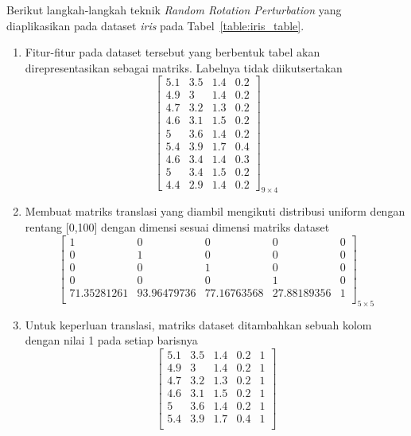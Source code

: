 \documentclass[a4paper,twoside]{article}
\begin{document}
\begin{enumerate}
		Berikut langkah-langkah teknik \textit{Random Rotation Perturbation} yang diaplikasikan pada dataset \textit{iris} pada Tabel~\ref{table:iris_table}.
		\begin{enumerate}
			\item Fitur-fitur pada dataset tersebut yang berbentuk tabel akan direpresentasikan sebagai matriks. Labelnya tidak diikutsertakan
			\[
				\begin{bmatrix}
				5.1		&		3.5		&		1.4		&		0.2	\\
				4.9		&		3		&		1.4		&		0.2	\\
				4.7		&		3.2		&		1.3		&		0.2	\\
				4.6		&		3.1		&		1.5		&		0.2	\\
				5		&		3.6		&		1.4		&		0.2	\\
				5.4		&		3.9		&		1.7		&		0.4	\\
				4.6		&		3.4		&		1.4		&		0.3	\\
				5		&		3.4		&		1.5		&		0.2	\\
				4.4		&		2.9		&		1.4		&		0.2 
				\end{bmatrix}_{9\times 4}
			\]
			\item Membuat matriks translasi yang diambil mengikuti distribusi uniform dengan rentang [0,100] dengan dimensi sesuai dimensi matriks dataset
			\[
				\begin{bmatrix}
					1				&		0				&		0				&		0			&		0 \\
					0				&		1				&		0				&		0			&		0 \\
					0				&		0				&		1				&		0			&		0 \\
					0				&		0				&		0				&		1 			&		0 \\
					71.35281261		&		93.96479736		&		77.16763568		&		27.88189356 &		1 \\
				\end{bmatrix}_{5\times 5}
			\]
			\item Untuk keperluan translasi, matriks dataset ditambahkan sebuah kolom dengan nilai 1 pada setiap barisnya
			\[
				\begin{bmatrix}
					5.1		&		3.5		&		1.4		&		0.2		&		1 \\
					4.9		&		3		&		1.4		&		0.2		&		1 \\
					4.7		&		3.2		&		1.3		&		0.2		&		1 \\
					4.6		&		3.1		&		1.5		&		0.2		&		1 \\
					5		&		3.6		&		1.4		&		0.2		&		1 \\
					5.4		&		3.9		&		1.7		&		0.4		&		1 \\

\end{bmatrix}\]
\end{enumerate}
\end{enumerate}
\end{document}
